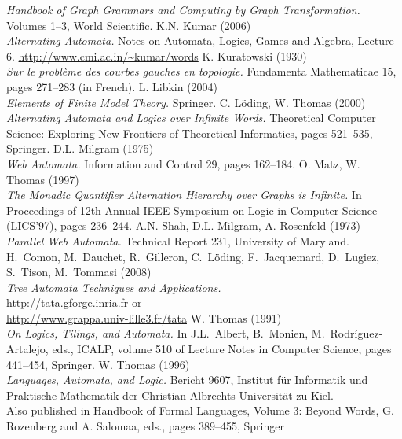 \documentclass[a4paper,11pt,twoside]{report} \pdfoutput=1
\begin{document}
\begin{thebibliography}{9}
  \emph{Handbook of Graph Grammars and Computing by Graph
    Transformation.} Volumes 1--3, World Scientific.
  K.N. Kumar (2006) \\
  \emph{Alternating Automata.} Notes on Automata, Logics, Games and
  Algebra, Lecture 6. \url{http://www.cmi.ac.in/~kumar/words}
  K. Kuratowski (1930) \\
  \emph{Sur le problème des courbes gauches en topologie.} Fundamenta
  Mathematicae 15, pages 271--283 (in French).
  L. Libkin (2004) \\
  \emph{Elements of Finite Model Theory.} Springer.
  C. Löding, W. Thomas (2000) \\
  \emph{Alternating Automata and Logics over Infinite Words.}
  Theoretical Computer Science: Exploring New Frontiers of Theoretical
  Informatics, pages 521--535, Springer.
  D.L. Milgram (1975) \\
  \emph{Web Automata.} Information and Control 29, pages 162--184.
  O. Matz, W. Thomas (1997) \\
  \emph{The Monadic Quantifier Alternation Hierarchy over Graphs is
    Infinite.} In Proceedings of 12th Annual IEEE Symposium on Logic
  in Computer Science (LICS’97), pages 236--244.
  A.N. Shah, D.L. Milgram, A. Rosenfeld (1973) \\
  \emph{Parallel Web Automata.} Technical Report 231, University of
  Maryland.
  H.~Comon, M.~Dauchet, R.~Gilleron,  C.~Löding, F.~Jacquemard, D.~Lugiez, S.~Tison, M.~Tommasi (2008) \\
  \emph{Tree Automata Techniques and Applications.} \\
  \url{http://tata.gforge.inria.fr} or \\
  \url{http://www.grappa.univ-lille3.fr/tata}
  W. Thomas (1991) \\
  \emph{On Logics, Tilings, and Automata.} In J.L.~Albert, B.~Monien,
  M.~Rodríguez-Artalejo, eds., ICALP, volume 510 of Lecture Notes in
  Computer Science, pages 441--454, Springer.
  W. Thomas (1996) \\
  \emph{Languages, Automata, and Logic.} Bericht 9607, Institut für
  Informatik und Praktische Mathematik der
  Christian-Albrechts-Universität zu Kiel. \\
  Also published in Handbook of Formal Languages, Volume 3: Beyond
  Words, G. Rozenberg and A. Salomaa, eds., pages 389--455, Springer

\end{thebibliography}
\end{document}
